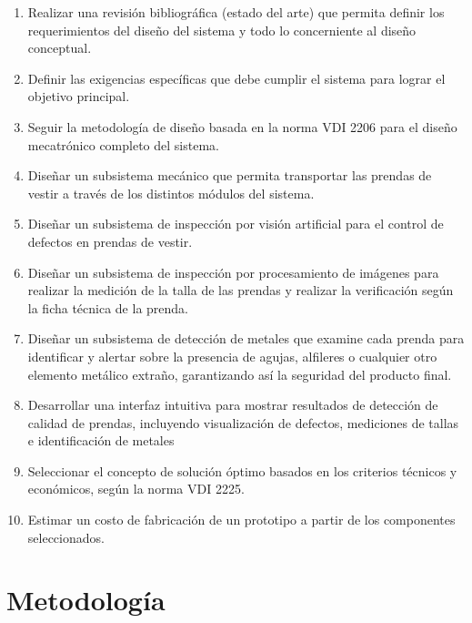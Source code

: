 \begin{enumerate}
\setlength\itemsep{-0.5em}
    \item Realizar una revisión bibliográfica (estado del arte) que permita definir los requerimientos del diseño del sistema y todo lo concerniente al diseño conceptual.
    
    \item Definir las exigencias específicas que debe cumplir el sistema para lograr el objetivo principal.
      
    \item Seguir la metodología de diseño basada en la norma VDI 2206 para el diseño mecatrónico completo del sistema.
        
    \item Diseñar un subsistema mecánico que permita transportar las prendas de vestir a través de los distintos módulos del sistema.
    
    \item Diseñar un subsistema de inspección por visión artificial para el control de defectos en prendas de vestir.
    
    \item Diseñar un subsistema de inspección por procesamiento de imágenes para realizar la medición de la talla de las prendas y realizar la verificación según la ficha técnica de la prenda.
    
    \item Diseñar un subsistema de detección de metales que examine cada prenda para identificar y alertar sobre la presencia de agujas, alfileres o cualquier otro elemento metálico extraño, garantizando así la seguridad del producto final.
    
    \item Desarrollar una interfaz intuitiva para mostrar resultados de detección de calidad de prendas, incluyendo visualización de defectos, mediciones de tallas e identificación de metales
    
    \item Seleccionar el concepto de solución óptimo basados en los criterios técnicos y económicos, según la norma VDI 2225.
    
    \item Estimar un costo de fabricación de un prototipo a partir de los componentes seleccionados.
    
    \label{lst:objetivos_especificos}
\end{enumerate}

\section{Metodología}

